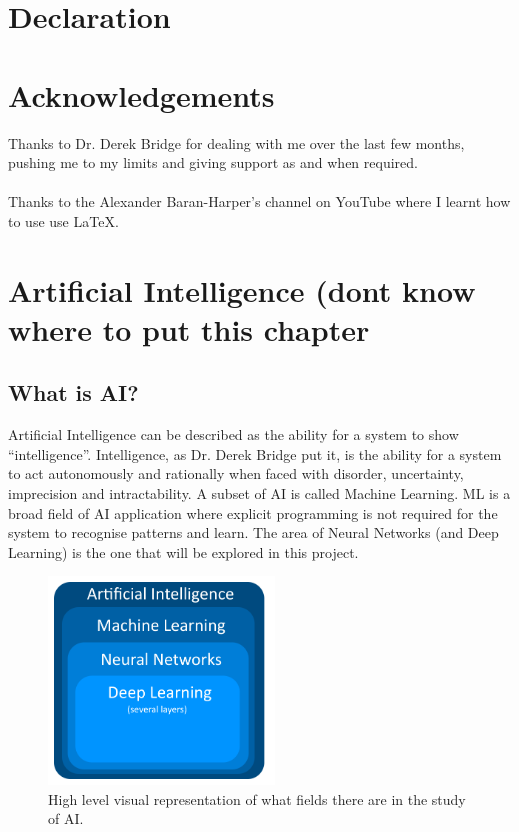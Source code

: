 \documentclass[10pt]{article}
\begin{document}
\section*{Declaration}
\clearpage

\section*{Acknowledgements}
Thanks to Dr. Derek Bridge for dealing with me over the last few months, pushing me to my limits and giving support as and when required.\\\\
Thanks to the Alexander Baran-Harper's channel on YouTube where I learnt how to use use LaTeX.
\clearpage


\tableofcontents
\thispagestyle{empty}
\cleardoublepage

\listoffigures
{}
\cleardoublepage


\setcounter{page}{1}


\section{Artificial Intelligence (dont know where to put this chapter}\label{sec:ai}
\subsection{What is AI?}
Artificial Intelligence can be described as the ability for a system to show “intelligence”. Intelligence, as Dr. Derek Bridge put it, is the ability for a system to act autonomously and rationally when faced with disorder, uncertainty, imprecision and intractability. A subset of AI is called Machine Learning. ML is a broad field of AI application where explicit programming is not required for the system to recognise patterns and learn. The area of Neural Networks (and Deep Learning) is the one that will be explored in this project.
\begin{figure}[H]
	\centering
	\includegraphics[width=6cm]{resources/ai.png}
	\caption{High level visual representation of what fields there are in the study of AI.}
	\label{fig:ai}
\end{figure}
\end{document}
